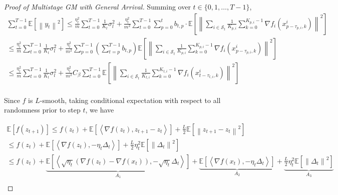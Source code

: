 \begin{proof}[Proof of Multistage GM with General Arrival]
Summing over $t\in\{0,1,\dots,T-1\}$,
\begin{equation}
\begin{gathered}
\sum_{t=0}^{T-1}\mathbb{E}\left[\left\| y_t\right\|^2\right] \leq
\frac{\eta_l^2}{m}\sum_{t=0}^{T-1}\frac{1}{K_t}\sigma^2_l + \frac{\eta_l^2}{m^2}\sum_{t=0}^{T-1} \sum_{p=0}^t b_{t,p} \cdot \mathbb{E}\left[\left\| \sum_{i\in\mathcal{S}_t} \frac{1}{K_{p,i}} \sum_{k=0}^{K_{p,i}-1}  \nabla f_i(x_{p-\tau_{p,i},k}^i) \right\|^2\right] \\
\leq \frac{\eta_l^2}{m}\sum_{t=0}^{T-1}\frac{1}{K_t}\sigma^2_l + \frac{\eta_l^2}{m^2} \sum_{p=0}^{T-1}\left(\sum_{t=p}^{T-1}b_{t,p}\right) \mathbb{E}\left[\left\| \sum_{i\in\mathcal{S}_t} \frac{1}{K_{p,i}} \sum_{k=0}^{K_{p,i}-1}  \nabla f_i(x_{p-\tau_{p,i},k}^i) \right\|^2\right]\\
\leq \frac{\eta_l^2}{m}\sum_{t=0}^{T-1}\frac{1}{K_t}\sigma^2_l + \frac{\eta_l^2}{m^2} C_\beta \sum_{t=0}^{T-1} \mathbb{E}\left[\left\| \sum_{i\in\mathcal{S}_t} \frac{1}{K_{t,i}} \sum_{k=0}^{K_{t,i}-1}  \nabla f_i(x_{t-\tau_{t,i},k}^i) \right\|^2\right]\\
\end{gathered}\nonumber
\end{equation}


Since $f$ is $L$-smooth, taking conditional expectation with respect to all randomness prior to step $t$, we have

\begin{equation}
\begin{gathered}
\mathbb{E}\left[f(z_{t+1})\right]\leq
f(z_t)+\mathbb{E}\left[\left\langle \nabla f(z_t),z_{t+1}-z_t \right\rangle\right]+\frac{L}{2}\mathbb{E}\left[\left\| z_{t+1}-z_t\right\|^2\right]\\
\leq f(z_t)+\mathbb{E}\left[\left\langle \nabla f(z_t),-\eta_t  \Delta_t \right\rangle\right]+\frac{L}{2}\eta_t^2\mathbb{E}\left[\left\| \Delta_t\right\|^2\right]\\
\leq f(z_t)+ \underbrace{\mathbb{E}\left[\left\langle \sqrt{\eta_t} \left(\nabla f(z_t)-\nabla f(x_t)\right),-\sqrt{\eta_t } \Delta_t \right\rangle\right]}_{A_1} + \underbrace{\mathbb{E}\left[\left\langle \nabla f(x_t),-\eta_t \Delta_t \right\rangle\right]}_{A_2} + \underbrace{\frac{L}{2}\eta_t^2\mathbb{E}\left[\left\| \Delta_t\right\|^2\right]}_{A_3} \\
\end{gathered}\nonumber
\end{equation}

 


\end{proof}
